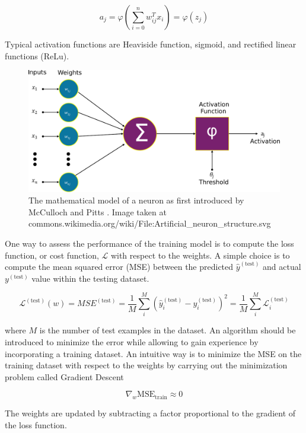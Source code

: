 \begin{equation} \label{eq:activation_funct}
    a_j =   \varphi \left(\sum_{i=0}^{n} w_{ij}^T x_i \right) =  \varphi
    \left( z_{j}\right)
\end{equation}

Typical activation functions are Heaviside function, sigmoid, and rectified
linear functions (ReLu).

\begin{figure}[h!]
    \centering
    \includegraphics[width=0.5\linewidth]{images/artificial_neuron.pdf}
    \caption{The mathematical model of a neuron as first introduced by
        McCulloch and Pitts \cite{mcculloch1943logical}. Image taken at
        commons.wikimedia.org/wiki/File:Artificial\_neuron\_structure.svg}
    \label{fig:neuron_struc}
\end{figure}

One way to assess the performance of the training model is to compute the loss
function, or cost function, $\mathcal{L}$ with respect to the weights. A simple
choice is to compute the mean squared error
(MSE)
between the predicted $\hat{y}^{(\text{test})}$ and actual $y^{(\text{test})}$
value within the testing
dataset.

\begin{equation}
    \mathcal{L}^{(\text{test})}(w) = MSE^{(\text{test})} = \frac{1}{M} \sum_i^M
    \left(
    \hat{y}_i^{(\text{test})} -
    y_i^{(\text{test})} \right)^2  = \frac{1}{M} \sum_i^M
    \mathcal{L}^{(\text{test})}_i
\end{equation}

where $M$ is the number of test examples in the dataset. An algorithm should be
introduced to minimize the error  while allowing to gain
experience by incorporating a training dataset.
An intuitive way is to minimize the MSE on the training dataset with respect to
the weights by carrying out
the minimization problem called Gradient Descent

\begin{equation}
    \nabla_w \text{MSE}_\text{train} \approx 0
\end{equation}

The weights are updated by subtracting a factor proportional to the
gradient of the loss function.

